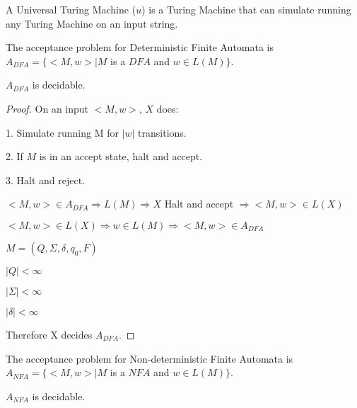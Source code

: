 \begin{definition}
    A Universal Turing Machine ($\mathit{u}$) is a Turing Machine that can simulate running any Turing Machine on an input string.
\end{definition}


    \begin{definition}
        The acceptance problem for Deterministic Finite Automata is $A_{DFA}=\{<M,w> | M$ is a $DFA$ and $w\in L(M)\}$.
    \end{definition}

    \begin{theorem}
        $A_{DFA}$ is decidable.
    \end{theorem}

    \begin{proof}
        On an input $<M,w>$, $X$ does:

        1. Simulate running M for $|w|$ transitions.

        2. If $M$ is in an accept state, halt and accept.
        
        3. Halt and reject.

        $<M,w>\in A_{DFA} \Rightarrow L(M) \Rightarrow X$ Halt and accept $\Rightarrow <M,w>\in L(X)$

        $<M,w>\in L(X) \Rightarrow w\in L(M) \Rightarrow <M,w>\in A_{DFA}$

        $M=(Q,\Sigma, \delta, q_0, F)$

            $|Q|<\infty$

            $|\Sigma|<\infty$

            $|\delta|<\infty$

        Therefore X decides $A_{DFA}$.
    \end{proof}

    \begin{definition}
        The acceptance problem for Non-deterministic Finite Automata is $A_{NFA}=\{<M,w> | M$ is a $NFA$ and $w\in L(M)\}$.
    \end{definition}

    \begin{theorem}
        $A_{NFA}$ is decidable.
    \end{theorem}

